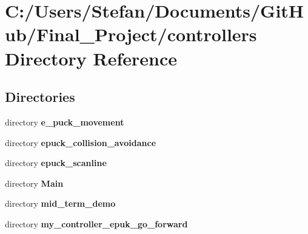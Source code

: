 \section{C\-:/\-Users/\-Stefan/\-Documents/\-Git\-Hub/\-Final\-\_\-\-Project/controllers Directory Reference}
\label{dir_695b0e9f5a9423ce178432b6dc5edddc}
\subsection*{Directories}
\begin{DoxyCompactItemize}
\item 
directory {\bf e\-\_\-puck\-\_\-movement}
\item 
directory {\bf epuck\-\_\-collision\-\_\-avoidance}
\item 
directory {\bf epuck\-\_\-scanline}
\item 
directory {\bf Main}
\item 
directory {\bf mid\-\_\-term\-\_\-demo}
\item 
directory {\bf my\-\_\-controller\-\_\-epuk\-\_\-go\-\_\-forward}
\end{DoxyCompactItemize}
